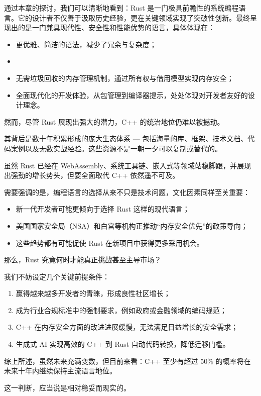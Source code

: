 通过本章的探讨，我们可以清晰地看到：Rust 是一门极具前瞻性的系统编程语言。它的设计者不仅善于汲取历史经验，更在关键领域实现了突破性创新。最终呈现出的是一门兼具现代性、安全性和性能优势的语言，具体体现在：

\begin{itemize}
\item 
更优雅、简洁的语法，减少了冗余与复杂度；

\item 
\item
无需垃圾回收的内存管理机制，通过所有权与借用模型实现内存安全；

\item 
全面现代化的开发体验，从包管理到编译器提示，处处体现对开发者友好的设计理念。
\end{itemize}

然而，尽管 Rust 展现出强大的潜力，C++ 的统治地位仍难以被撼动。

其背后是数十年积累形成的庞大生态体系 --- 包括海量的库、框架、技术文档、代码案例以及无数实战经验。这些资源不是一朝一夕可以复制或替代的。

虽然 Rust 已经在 WebAssembly、系统工具链、嵌入式等领域站稳脚跟，并展现出强劲的增长势头，但要全面取代 C++ 依然遥不可及。

需要强调的是，编程语言的选择从来不只是技术问题，文化因素同样至关重要：

\begin{itemize}
\item 
新一代开发者可能更倾向于选择 Rust 这样的现代语言；

\item 
美国国家安全局（NSA）和白宫等机构正推动“内存安全优先”的政策导向；

\item 
这些趋势都有可能促使 Rust 在新项目中获得更多采用机会。
\end{itemize}

那么，Rust 究竟何时才能真正挑战甚至主导市场？

我们不妨设定几个关键前提条件：

\begin{enumerate}
\item 
赢得越来越多开发者的青睐，形成良性社区增长；

\item 
成为行业合规标准中的强制要求，例如政府或金融领域的编码规范；

\item 
C++ 在内存安全方面的改进进展缓慢，无法满足日益增长的安全需求；

\item 
生成式 AI 实现高效的 C++ 到 Rust 自动代码转换，降低迁移门槛。
\end{enumerate}

综上所述，虽然未来充满变数，但目前来看：C++ 至少有超过 50\% 的概率将在未来十年内继续保持主流语言地位。

这一判断，应当说是相对稳妥而现实的。
